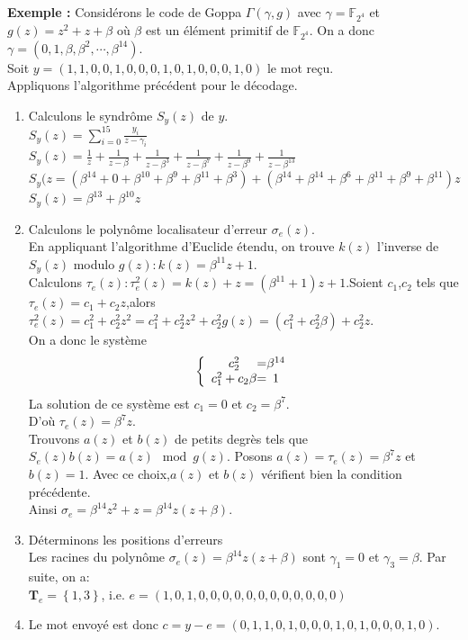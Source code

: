 \documentclass[12pt,openany]{report}
\begin{document}
 \textbf{Exemple :} Considérons le code de Goppa $ \Gamma(\gamma , g)$ avec $\gamma = \mathbb{F}_{2^4}$ et $g(z)=z^2 + z+\beta$ où $\beta$ est un élément primitif de $\mathbb{F}_{2^4}$. On a donc $\gamma=(0,1,\beta,\beta^2,\cdots,\beta^{14}). $\\
 Soit $y=(1,1,0,0,1,0,0,0,1,0,1,0,0,0,1,0)$ le mot reçu.\\
 Appliquons l'algorithme précédent pour le décodage.\\
 \begin{enumerate}
 \item Calculons le syndrôme $\mathit{S}_{y}(z) $ de $y$.\\
 
 $\mathit{S}_{y}(z)=\sum_{i=0}^{15}\frac{y_i}{z-\gamma_i}$\\
 $\mathit{S}_{y}(z)=\frac{1}{z} + \frac{1}{z-\beta} + \frac{1}{z-\beta^3}+ \frac{1}{z-\beta^7}+ \frac{1}{z-\beta^9}+ \frac{1}{z-\beta^{13}}$\\
 $\mathit{S}_{y}(z = (\beta^{14}+ 0+ \beta^{10}+\beta^{9}+ \beta^{11}+\beta^{3})+(\beta^{14}+ \beta^{14}+ \beta^{6}+\beta^{11}+ \beta^{9}+\beta^{11})z   $\\
 $\mathit{S}_{y}(z) =\beta^{13} + \beta^{10}z$
 \item Calculons le polynôme localisateur d'erreur $\sigma_{e}(z)$.\\
 En appliquant l'algorithme d'Euclide étendu, on trouve $k(z)$ l'inverse de $\mathit{S}_{y}(z)$ modulo $g(z):k(z)=\beta^{11}z+1  $.\\
 Calculons $\tau_{e}(z):\tau_{e}^{2}(z)=k(z)+z=(\beta^{11}+1)z+1  $.Soient $c_1$,$c_2$ tels que $\tau_{e}(z)=c_1+
 c_{2}z$,alors $\tau_{e}^{2}(z)=c_1^{2}+c_{2}^{2}z^{2}=c_{1}^{2}+c_{2}^{2}z^{2}+c_{2}^{2}g(z)=(c_{1}^{2}+c_{2}^{2}\beta)+ c_{2}^{2}z$.\\
 
 On a donc le système \[
\left \{
\begin{array}{c @{=} c}
    c_{2}^{2} & \beta^{14} \\
    c_{1}^{2}+c_{2}\beta & 1
\end{array}
\right.
\]
 La solution de ce système est $c_1=0 $ et $c_2=\beta^{7}$.\\
 D'où $\tau_{e}(z)=\beta^{7}z$.\\
 Trouvons $a(z)$ et $b(z)$ de petits degrès tels que $\mathit{S}_{e}(z)b(z)=a(z) \mod g(z).$ Posons $a(z)=\tau_{e}(z)=\beta^{7}z $ et $b(z)=1.$ Avec ce choix,$a(z)$ et $b(z)$ vérifient bien la condition précédente.\\
 Ainsi $ \sigma_{e}=\beta^{14}z^{2}+z = \beta^{14}z(z+\beta).$
\item Déterminons les positions d'erreurs\\
Les racines du polynôme $\sigma_{e}(z)=\beta^{14}z(z+\beta)$ sont $\gamma_1=0 $ et $\gamma_3=\beta $. Par suite, on a:\\
$\mathbf{T}_{e}=\left\lbrace 1,3 \right\rbrace  $, i.e. $e=(1,0,1,0,0,0,0,0,0,0,0,0,0,0,0)$
\item Le mot envoyé est donc $c=y-e=(0,1,1,0,1,0,0,0,1,0,1,0,0,0,1,0)  .$
 
 
 
 \end{enumerate}
  
\end{document}
